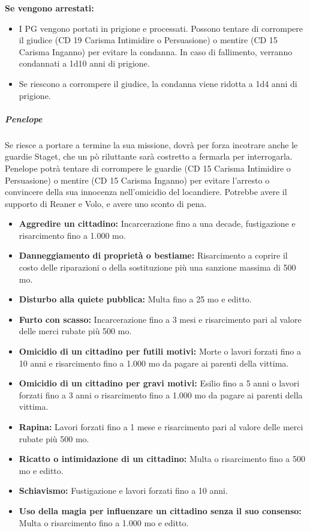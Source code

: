 \documentclass{article}
\begin{document}
    \textbf{Se vengono arrestati:}
    \begin{itemize}
        \item I PG vengono portati in prigione e processati. Possono tentare di corrompere il giudice (CD 19 Carisma Intimidire o Persuasione) o mentire (CD 15 Carisma Inganno) per evitare la condanna. In caso di fallimento, verranno condannati a 1d10 anni di prigione. 
        \item Se riescono a corrompere il giudice, la condanna viene ridotta a 1d4 anni di prigione.
\end{itemize}    
    \subparagraph{Penelope}
    Se riesce a portare a termine la sua missione, dovrà per forza incotrare anche le guardie Staget, che un pò riluttante sarà costretto a fermarla per interrogarla. Penelope potrà tentare di corrompere le guardie (CD 15 Carisma Intimidire o Persuasione) o mentire (CD 15 Carisma Inganno) per evitare l'arresto o convincere della sua innocenza nell'omicidio del locandiere. Potrebbe avere il supporto di Reaner e Volo, e avere uno sconto di pena. 
\begin{itemize}
    \item \textbf{Aggredire un cittadino:} Incarcerazione fino a una decade, fustigazione e risarcimento fino a 1.000 mo.
    \item \textbf{Danneggiamento di proprietà o bestiame:} Risarcimento a coprire il costo delle riparazioni o della sostituzione più una sanzione massima di 500 mo.
    \item \textbf{Disturbo alla quiete pubblica:} Multa fino a 25 mo e editto.
    \item \textbf{Furto con scasso:} Incarcerazione fino a 3 mesi e risarcimento pari al valore delle merci rubate più 500 mo.
    \item \textbf{Omicidio di un cittadino per futili motivi:} Morte o lavori forzati fino a 10 anni e risarcimento fino a 1.000 mo da pagare ai parenti della vittima.
    \item \textbf{Omicidio di un cittadino per gravi motivi:} Esilio fino a 5 anni o lavori forzati fino a 3 anni o risarcimento fino a 1.000 mo da pagare ai parenti della vittima.
    \item \textbf{Rapina:} Lavori forzati fino a 1 mese e risarcimento pari al valore delle merci rubate più 500 mo.
    \item \textbf{Ricatto o intimidazione di un cittadino:} Multa o risarcimento fino a 500 mo e editto.
    \item \textbf{Schiavismo:} Fustigazione e lavori forzati fino a 10 anni.
    \item \textbf{Uso della magia per influenzare un cittadino senza il suo consenso:} Multa o risarcimento fino a 1.000 mo e editto.
\end{itemize}
\end{document}
